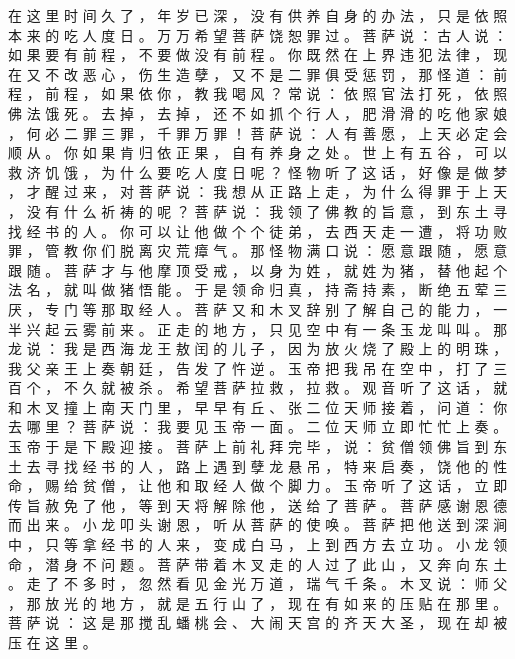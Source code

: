 {在 这 里 时 间 久 了 ， 年 岁 已 深 ， 没 有 供 养 自 身 的 办 法 ， 只 是 依 照 本 来 的 吃 人 度 日 。
万 万 希 望 菩 萨 饶 恕 罪 过 。
菩 萨 说 ： 古 人 说 ： 如 果 要 有 前 程 ， 不 要 做 没 有 前 程 。
你 既 然 在 上 界 违 犯 法 律 ， 现 在 又 不 改 恶 心 ， 伤 生 造 孽 ， 又 不 是 二 罪 俱 受 惩 罚 ， 那 怪 道 ： 前 程 ， 前 程 ， 如 果 依 你 ， 教 我 喝 风 ？ 常 说 ： 依 照 官 法 打 死 ， 依 照 佛 法 饿 死 。
去 掉 ， 去 掉 ， 还 不 如 抓 个 行 人 ， 肥 滑 滑 的 吃 他 家 娘 ， 何 必 二 罪 三 罪 ， 千 罪 万 罪 ！ 菩 萨 说 ： 人 有 善 愿 ， 上 天 必 定 会 顺 从 。
你 如 果 肯 归 依 正 果 ， 自 有 养 身 之 处 。
世 上 有 五 谷 ， 可 以 救 济 饥 饿 ， 为 什 么 要 吃 人 度 日 呢 ？ 怪 物 听 了 这 话 ， 好 像 是 做 梦 ， 才 醒 过 来 ， 对 菩 萨 说 ： 我 想 从 正 路 上 走 ， 为 什 么 得 罪 于 上 天 ， 没 有 什 么 祈 祷 的 呢 ？
菩 萨 说 ： 我 领 了 佛 教 的 旨 意 ， 到 东 土 寻 找 经 书 的 人 。
你 可 以 让 他 做 个 个 徒 弟 ， 去 西 天 走 一 遭 ， 将 功 败 罪 ， 管 教 你 们 脱 离 灾 荒 瘴 气 。
那 怪 物 满 口 说 ： 愿 意 跟 随 ， 愿 意 跟 随 。
菩 萨 才 与 他 摩 顶 受 戒 ， 以 身 为 姓 ， 就 姓 为 猪 ， 替 他 起 个 法 名 ， 就 叫 做 猪 悟 能 。
于 是 领 命 归 真 ， 持 斋 持 素 ， 断 绝 五 荤 三 厌 ， 专 门 等 那 取 经 人 。
菩 萨 又 和 木 叉 辞 别 了 解 自 己 的 能 力 ， 一 半 兴 起 云 雾 前 来 。
正 走 的 地 方 ， 只 见 空 中 有 一 条 玉 龙 叫 叫 。
那 龙 说 ： 我 是 西 海 龙 王 敖 闰 的 儿 子 ， 因 为 放 火 烧 了 殿 上 的 明 珠 ， 我 父 亲 王 上 奏 朝 廷 ， 告 发 了 忤 逆 。
玉 帝 把 我 吊 在 空 中 ， 打 了 三 百 个 ， 不 久 就 被 杀 。
希 望 菩 萨 拉 救 ， 拉 救 。
观 音 听 了 这 话 ， 就 和 木 叉 撞 上 南 天 门 里 ， 早 早 有 丘 、 张 二 位 天 师 接 着 ， 问 道 ： 你 去 哪 里 ？ 菩 萨 说 ： 我 要 见 玉 帝 一 面 。
二 位 天 师 立 即 忙 忙 上 奏 。
玉 帝 于 是 下 殿 迎 接 。
菩 萨 上 前 礼 拜 完 毕 ， 说 ： 贫 僧 领 佛 旨 到 东 土 去 寻 找 经 书 的 人 ， 路 上 遇 到 孽 龙 悬 吊 ， 特 来 启 奏 ， 饶 他 的 性 命 ， 赐 给 贫 僧 ， 让 他 和 取 经 人 做 个 脚 力 。
玉 帝 听 了 这 话 ， 立 即 传 旨 赦 免 了 他 ， 等 到 天 将 解 除 他 ， 送 给 了 菩 萨 。
菩 萨 感 谢 恩 德 而 出 来 。
小 龙 叩 头 谢 恩 ， 听 从 菩 萨 的 使 唤 。
菩 萨 把 他 送 到 深 涧 中 ， 只 等 拿 经 书 的 人 来 ， 变 成 白 马 ， 上 到 西 方 去 立 功 。
小 龙 领 命 ， 潜 身 不 问 题 。
菩 萨 带 着 木 叉 走 的 人 过 了 此 山 ， 又 奔 向 东 土 。
走 了 不 多 时 ， 忽 然 看 见 金 光 万 道 ， 瑞 气 千 条 。
木 叉 说 ： 师 父 ， 那 放 光 的 地 方 ， 就 是 五 行 山 了 ， 现 在 有 如 来 的 压 贴 在 那 里 。
菩 萨 说 ： 这 是 那 搅 乱 蟠 桃 会 、 大 闹 天 宫 的 齐 天 大 圣 ， 现 在 却 被 压 在 这 里 。
}
